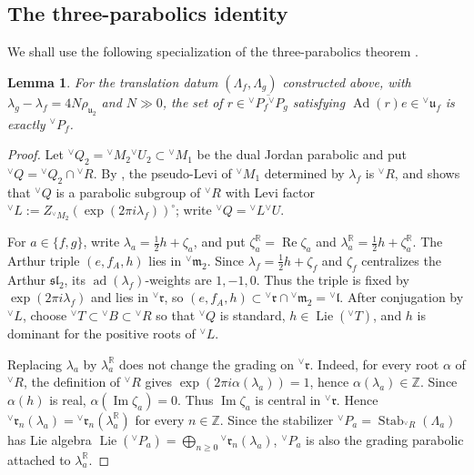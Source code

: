 \documentclass[10pt]{amsart}
\numberwithin{equation}{section}
\theoremstyle{plain}
\newtheorem{lemma}[proposition]{Lemma}
\theoremstyle{definition}
\theoremstyle{remark}
\DeclareMathOperator{\Stab}{Stab}
\DeclareMathOperator{\Lie}{Lie}
\newcommand{\ZZ}{\mathbb Z}
\newcommand{\fm}{\mathfrak m}
\newcommand{\fr}{\mathfrak r}
\newcommand{\fu}{\mathfrak u}
\newcommand{\vB}{{}^{\vee}B}
\newcommand{\vT}{{}^{\vee}T}
\newcommand{\vL}{{}^{\vee}L}
\newcommand{\vM}{{}^{\vee}M}
\newcommand{\vQ}{{}^{\vee}Q}
\newcommand{\vU}{{}^{\vee}U}
\newcommand{\vR}{{}^{\vee}R}
\newcommand{\vP}{{}^{\vee}P}
\newcommand{\vfm}{{}^{\vee}\fm}
\newcommand{\vfr}{{}^{\vee}\fr}
\newcommand{\vfu}{{}^{\vee}\fu}
\begin{document}
\subsection{The three-parabolics identity}

We shall use the following specialization of the three-parabolics theorem
\cite[Theorem~A.2.1]{AIMV26}.

\begin{lemma}\label{lem:three-parabolics}
For the translation datum $(\Lambda_f,\Lambda_g)$ constructed above, with
$\lambda_g-\lambda_f=4N\rho_{\fu_2}$ and $N\gg0$, the set of
$r\in\overline{\vP_f\vP_g}$ satisfying
$\operatorname{Ad}(r)e\in\vfu_f$ is exactly $\vP_f$.
\end{lemma}

\begin{proof}
Let $\vQ_2=\vM_2\vU_2\subset\vM_1$ be the dual Jordan parabolic and put
$\vQ=\vQ_2\cap\vR$. By \cite[Lemma~4.3.1]{AIMV26}, the pseudo-Levi of
$\vM_1$ determined by $\lambda_f$ is $\vR$, and
\cite[Lemma~4.4.1(i)]{AIMV26} shows that $\vQ$ is a parabolic subgroup of
$\vR$ with Levi factor
$\vL:=Z_{\vM_2}(\exp(2\pi i\lambda_f))^\circ$; write $\vQ=\vL\vU$.

For $a\in\{f,g\}$, write $\lambda_a=\tfrac12h+\zeta_a$, and put
$\zeta_a^{\mathbb R}=\operatorname{Re}\zeta_a$ and
$\lambda_a^{\mathbb R}=\tfrac12h+\zeta_a^{\mathbb R}$. The Arthur triple $(e,f_A,h)$ lies in $\vfm_2$. Since
$\lambda_f=\tfrac12h+\zeta_f$ and $\zeta_f$ centralizes the Arthur
$\mathfrak{sl}_2$, its $\operatorname{ad}(\lambda_f)$-weights are
$1,-1,0$. Thus the triple is fixed by $\exp(2\pi i\lambda_f)$ and lies in
$\vfr$, so $(e,f_A,h)\subset\vfr\cap\vfm_2={}^\vee\mathfrak l$. After conjugation by
$\vL$, choose $\vT\subset\vB\subset\vR$ so that $\vQ$ is standard,
$h\in\Lie(\vT)$, and $h$ is dominant for the positive roots of $\vL$.


Replacing $\lambda_a$ by $\lambda_a^{\mathbb R}$ does not change the
grading on $\vfr$. Indeed, for every root $\alpha$ of $\vR$, the definition
of $\vR$ gives $\exp(2\pi i\alpha(\lambda_a))=1$, hence
$\alpha(\lambda_a)\in\ZZ$. Since $\alpha(h)$ is real,
$\alpha(\operatorname{Im}\zeta_a)=0$. Thus
$\operatorname{Im}\zeta_a$ is central in $\vfr$. Hence
$\vfr_n(\lambda_a)=\vfr_n(\lambda_a^{\mathbb R})$ for every $n\in\ZZ$.
Since the stabilizer
$\vP_a=\Stab_{\vR}(\Lambda_a)$ has Lie algebra
$\Lie(\vP_a)=\bigoplus_{n\geq0}\vfr_n(\lambda_a)$, $\vP_a$ is also
the grading parabolic attached to $\lambda_a^{\mathbb R}$.


\end{proof}
\end{document}
